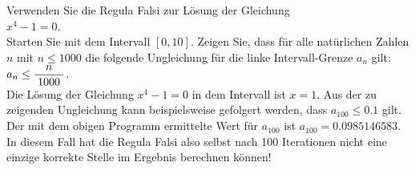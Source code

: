 \exercise
 Verwenden Sie die Regula Falsi zur L\"osung der Gleichung 
\\[0.2cm]
\hspace*{1.3cm}
$x^4 - 1 = 0$.
\\[0.2cm]
Starten Sie mit dem Intervall $[0, 10]$. Zeigen Sie, dass f\"ur alle nat\"urlichen Zahlen $n$
mit $n \leq 1000$ die folgende Ungleichung f\"ur die linke Intervall-Grenze $a_n$ gilt:
\\[0.2cm]
\hspace*{1.3cm} $a_n \leq \displaystyle\frac{\;\displaystyle n\;}{\;\displaystyle1000\;}$.
\\[0.2cm]
Die L\"osung der Gleichung $x^4 - 1 = 0$ in dem Intervall ist $x=1$.  Aus der zu zeigenden
Ungleichung kann beispielsweise gefolgert werden, dass $a_{100} \leq 0.1$ gilt.  
 Der mit dem obigen Programm ermittelte Wert f\"ur $a_{100}$ ist
$a_{100} = 0.0985146583$.  In diesem Fall hat die Regula Falsi also selbst nach  100
Iterationen nicht eine einzige korrekte Stelle 
im Ergebnis berechnen k\"onnen!  \eox
\vspace*{0.3cm}

